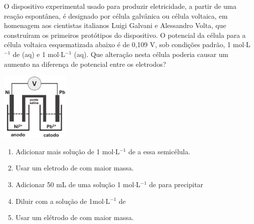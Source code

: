  O dispositivo experimental usado para produzir eletricidade, a partir de uma reação espontânea, é designado por célula galvânica ou célula voltaica, em homenagem aos cientistas italianos Luigi Galvani e Alessandro Volta, que construíram os primeiros protótipos do dispositivo. O potencial da célula para a célula voltaica esquematizada abaixo é de 0,109 V, sob condições padrão, 1 mol$\cdot$L$^{-1}$ de (aq) e 1 mol$\cdot$L$^{-1}$ (aq). Que alteração nesta célula poderia causar um aumento na diferença de potencial entre os eletrodos?

\begin{center}
\includegraphics[width=0.25\textwidth]{figure.png}
\end{center}

\begin{enumerate}[label = (\alph*)]
	\item Adicionar mais solução de 1 mol$\cdot$L$^{-1}$ de  a essa semicélula.
	\item Usar um eletrodo de  com maior massa. 
	\item Adicionar 50 mL de uma solução 1 mol$\cdot$L$^{-1}$ de  para precipitar 
	\item Diluir com  a solução de 1mol$\cdot$L$^{-1}$ de 
	\item Usar um elétrodo de  com maior massa.
\end{enumerate}
